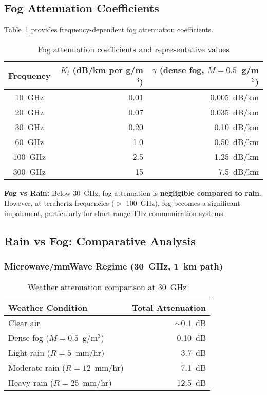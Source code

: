 \subsection{Fog Attenuation Coefficients}

Table~\ref{tab:fog-coeffs} provides frequency-dependent fog attenuation coefficients.

\begin{table}[h!]
\centering
\caption{Fog attenuation coefficients and representative values}
\label{tab:fog-coeffs}
\begin{tabular}{@{}crr@{}}
\toprule
Frequency & $K_l$ (dB/km per g/m$^3$) & $\gamma$ (dense fog, $M = 0.5$~g/m$^3$) \\
\midrule
10~GHz & 0.01 & 0.005~dB/km \\
20~GHz & 0.07 & 0.035~dB/km \\
30~GHz & 0.20 & 0.10~dB/km \\
60~GHz & 1.0 & 0.50~dB/km \\
100~GHz & 2.5 & 1.25~dB/km \\
300~GHz & 15 & 7.5~dB/km \\
\bottomrule
\end{tabular}
\end{table}

\begin{keyconcept}
\textbf{Fog vs Rain:} Below 30~GHz, fog attenuation is \textbf{negligible compared to rain}. However, at terahertz frequencies ($>$ 100~GHz), fog becomes a significant impairment, particularly for short-range THz communication systems.
\end{keyconcept}

\subsection{Rain vs Fog: Comparative Analysis}

\subsubsection{Microwave/mmWave Regime (30~GHz, 1~km path)}

\begin{table}[h!]
\centering
\caption{Weather attenuation comparison at 30~GHz}
\label{tab:rain-fog-30ghz}
\begin{tabular}{@{}lr@{}}
\toprule
Weather Condition & Total Attenuation \\
\midrule
Clear air & $\sim$0.1~dB \\
Dense fog ($M = 0.5$~g/m$^3$) & 0.10~dB \\
Light rain ($R = 5$~mm/hr) & 3.7~dB \\
Moderate rain ($R = 12$~mm/hr) & 7.1~dB \\
Heavy rain ($R = 25$~mm/hr) & 12.5~dB \\
\bottomrule
\end{tabular}
\end{table}

